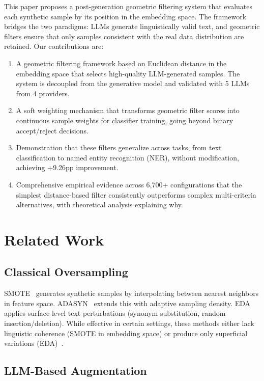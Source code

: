 \documentclass[conference]{IEEEtran}
\begin{document}
This paper proposes a post-generation geometric filtering system that evaluates each synthetic sample by its position in the embedding space. The framework bridges the two paradigms: LLMs generate linguistically valid text, and geometric filters ensure that only samples consistent with the real data distribution are retained. Our contributions are:

\begin{enumerate}
    \item A geometric filtering framework based on Euclidean distance in the embedding space that selects high-quality LLM-generated samples. The system is decoupled from the generative model and validated with 5 LLMs from 4 providers.
    \item A soft weighting mechanism that transforms geometric filter scores into continuous sample weights for classifier training, going beyond binary accept/reject decisions.
    \item Demonstration that these filters generalize across tasks, from text classification to named entity recognition (NER), without modification, achieving +9.26pp improvement.
    \item Comprehensive empirical evidence across 6,700+ configurations that the simplest distance-based filter consistently outperforms complex multi-criteria alternatives, with theoretical analysis explaining why.
\end{enumerate}

\section{Related Work}

\subsection{Classical Oversampling}

SMOTE~\cite{chawla2002smote} generates synthetic samples by interpolating between nearest neighbors in feature space. ADASYN~\cite{he2008adasyn} extends this with adaptive sampling density. EDA~\cite{wei2019eda} applies surface-level text perturbations (synonym substitution, random insertion/deletion). While effective in certain settings, these methods either lack linguistic coherence (SMOTE in embedding space) or produce only superficial variations (EDA)~\cite{feng2021survey,taskiran2025comprehensive}.

\subsection{LLM-Based Augmentation}
\end{document}
